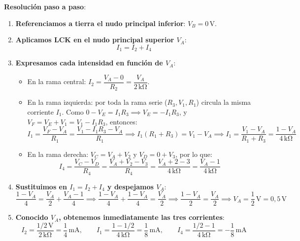 \begin{ejemplo}
\textbf{Resolución paso a paso}:
\begin{enumerate}
    \item \textbf{Referenciamos a tierra el nudo principal inferior}: $V_B = 0\,\si{\volt}$.
    \item \textbf{Aplicamos LCK en el nudo principal superior $V_A$}:
    \begin{equation*}
        I_1 = I_2 + I_4
    \end{equation*}
    \item \textbf{Expresamos cada intensidad en función de $V_A$}:
    \begin{itemize}
        \item En la rama central: $I_2 = \dfrac{V_A - 0}{R_2} = \dfrac{V_A}{2\,\si{\kilo\ohm}}$.
        \item En la rama izquierda: por toda la rama serie ($R_3, V_1, R_1$) circula la misma corriente $I_1$. Como $0 - V_E = I_1 R_3 \implies V_E = -I_1 R_3$, y $V_F = V_E + V_1 = V_1 - I_1 R_3$, entonces:
        \begin{equation*}
            I_1 = \frac{V_F - V_A}{R_1} = \frac{V_1 - I_1 R_3 - V_A}{R_1} \implies I_1(R_1 + R_3) = V_1 - V_A \implies I_1 = \frac{V_1 - V_A}{R_1 + R_3} = \frac{1 - V_A}{4\,\si{\kilo\ohm}}
        \end{equation*}
        \item En la rama derecha: $V_C = V_A + V_2$ y $V_D = 0 + V_3$, por lo que:
        \begin{equation*}
            I_4 = \frac{V_C - V_D}{R_4} = \frac{V_A + V_2 - V_3}{R_4} = \frac{V_A + 2 - 3}{4\,\si{\kilo\ohm}} = \frac{V_A - 1}{4\,\si{\kilo\ohm}}
        \end{equation*}
    \end{itemize}
    \item \textbf{Sustituimos en $I_1 = I_2 + I_4$ y despejamos $V_A$}:
    \begin{equation*}
        \frac{1 - V_A}{4} = \frac{V_A}{2} + \frac{V_A - 1}{4} \implies \frac{1 - V_A}{4} + \frac{1 - V_A}{4} = \frac{V_A}{2} \implies \frac{1 - V_A}{2} = \frac{V_A}{2} \implies \boxed{V_A = \frac{1}{2}\,\si{\volt} = 0{,}5\,\si{\volt}}
    \end{equation*}
    \item \textbf{Conocido $V_A$, obtenemos inmediatamente las tres corrientes}:
    \begin{equation*}
        I_2 = \frac{1/2\,\si{\volt}}{2\,\si{\kilo\ohm}} = \frac{1}{4}\,\si{\milli\ampere}, \qquad I_1 = \frac{1 - 1/2}{4\,\si{\kilo\ohm}} = \frac{1}{8}\,\si{\milli\ampere}, \qquad I_4 = \frac{1/2 - 1}{4\,\si{\kilo\ohm}} = -\frac{1}{8}\,\si{\milli\ampere}
    \end{equation*}
\end{enumerate}
\end{ejemplo}

